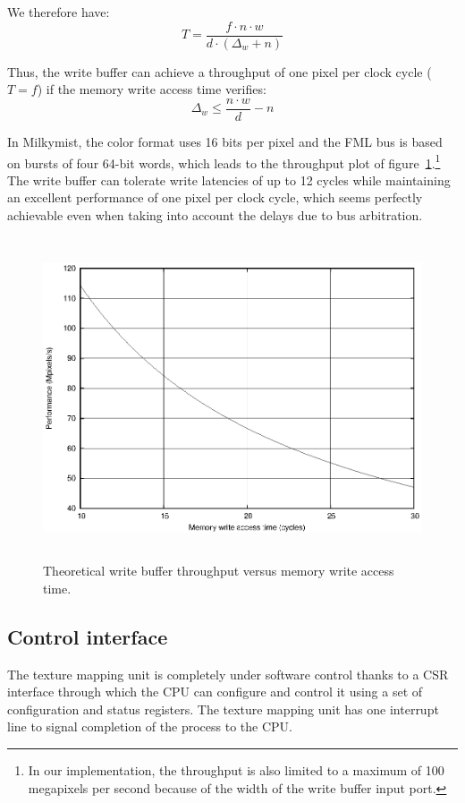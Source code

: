 \documentclass[a4paper,11pt]{kthesis}
\begin{document}
We therefore have:
\begin{equation}
T = \frac{f \cdot n \cdot w}{d \cdot (\Delta_{w} + n)}
\end{equation}

Thus, the write buffer can achieve a throughput of one pixel per clock cycle ($T = f$) if the memory write access time verifies:
\begin{equation}
\Delta_{w} \leq \frac{n \cdot w}{d} - n
\end{equation}

In Milkymist, the color format uses 16 bits per pixel and the FML bus is based on bursts of four 64-bit words, which leads to the throughput plot of figure~\ref{fig:thwbufperf}.\footnote{In our implementation, the throughput is also limited to a maximum of 100 megapixels per second because of the width of the write buffer input port.} The write buffer can tolerate write latencies of up to 12 cycles while maintaining an excellent performance of one pixel per clock cycle, which seems perfectly achievable even when taking into account the delays due to bus arbitration.

\begin{figure}[htp]
\centering
\includegraphics[height=95mm]{thwbufperf.eps}
\caption{Theoretical write buffer throughput versus memory write access time.}
\label{fig:thwbufperf}
\end{figure}

\subsection{Control interface}
\label{subsec:tmucsr}
The texture mapping unit is completely under software control thanks to a CSR interface through which the CPU can configure and control it using a set of configuration and status registers. The texture mapping unit has one interrupt line to signal completion of the process to the CPU.
\end{document}

